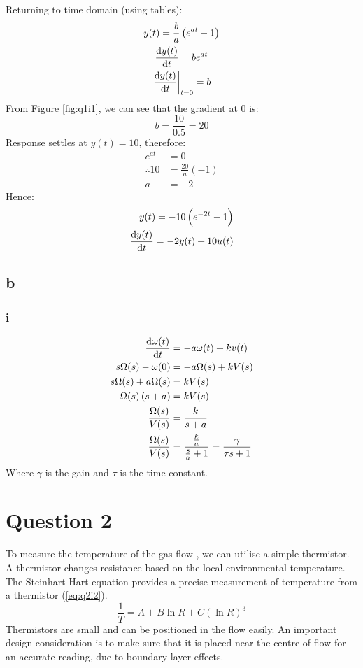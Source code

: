 \documentclass[11pt]{article}
\numberwithin{equation}{section}
\begin{document}
Returning to time domain (using tables):
\begin{gather}
    y(t) = \frac{b}{a} \left(e^{at}-1\right) \label{eq:q1i2}\\
    \frac{\dif y(t)}{\dif t} = be^{at}\\
    \left. \frac{\dif y(t)}{\dif t} \right|_{t = 0} = b
\end{gather}
From Figure \ref{fig:q1i1}, we can see that the gradient at 0 is:
\begin{equation}
    b = \frac{10}{0.5} = 20
\end{equation}
Response settles at $y(t) = 10$, therefore:
\begin{align}
    e^{at} &= 0\\
    \therefore 10 &= \frac{20}{a}\left(-1\right)\\
    a &= -2
\end{align}
Hence:
\begin{align}
    y(t) = -10 \left(e^{-2t}-1\right)\\
    \frac{\dif y(t)}{\dif t} = -2y(t) + 10u(t)
\end{align}
\subsection{b}
\subsubsection{i}
\begin{align}
    \frac{\dif \omega(t)}{\dif t} &= -a\omega(t) + kv(t)\\
    s \Omega(s) - \omega(0) &= -a \Omega(s) + kV(s)\\
    s\Omega(s) +a\Omega (s) &= kV(s)\\
    \Omega(s)\left(s+a\right) &= kV(s)\\
    \frac{\Omega (s)}{V(s)} &= \frac{k}{s+a}\\
    \frac{\Omega (s)}{V(s)} &= \frac{\frac{k}{a}}{\frac{s}{a}+1} = \frac{\gamma}{\tau s + 1}
\end{align}
Where $\gamma$ is the gain and $\tau$ is the time constant.
\section{Question 2}
To measure the temperature of the gas flow , we can utilise a simple thermistor. A thermistor changes resistance based on the local environmental temperature. The Steinhart-Hart equation provides a precise measurement of temperature from a thermistor (\ref{eq:q2i2}). 
\begin{equation}
    \frac{1}{T} = A + B \ln R + C \left(\ln R\right)^3 \label{eq:q2i2}
\end{equation}
Thermistors are small and can be positioned in the flow easily. An important design consideration is to make sure that it is placed near the centre of flow for an accurate reading, due to boundary layer effects. 
\end{document}
